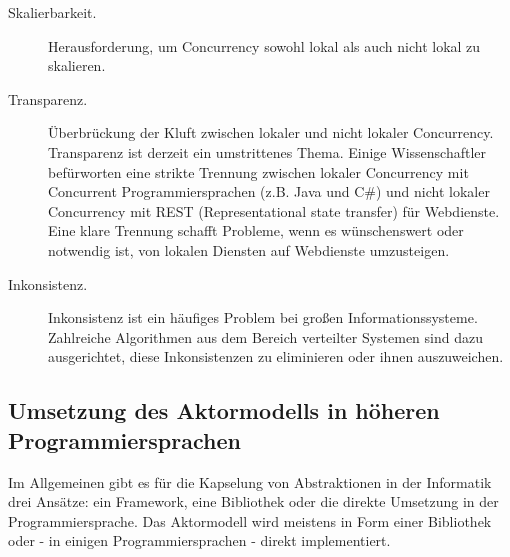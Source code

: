 \begin{description} 
	\item[Skalierbarkeit.] Herausforderung, um Concurrency sowohl lokal als auch nicht lokal zu skalieren.
	
	\item[Transparenz.] Überbrückung der Kluft zwischen lokaler und nicht lokaler Concurrency. Transparenz ist derzeit ein umstrittenes Thema. Einige Wissenschaftler befürworten eine strikte Trennung zwischen lokaler Concurrency mit Concurrent Programmiersprachen (z.B. Java und C\#) und nicht lokaler Concurrency mit REST (Representational state transfer) für Webdienste. Eine klare Trennung schafft Probleme, wenn es wünschenswert oder notwendig ist, von lokalen Diensten auf Webdienste umzusteigen.
	
	\item[Inkonsistenz.] Inkonsistenz ist ein häufiges Problem bei großen Informationssysteme. Zahlreiche Algorithmen aus dem Bereich verteilter Systemen sind dazu ausgerichtet, diese Inkonsistenzen zu eliminieren oder ihnen auszuweichen.
\end{description}

\subsection{Umsetzung des Aktormodells in höheren Programmiersprachen}

Im Allgemeinen gibt es für die Kapselung von Abstraktionen in der Informatik drei Ansätze: ein Framework, eine Bibliothek oder die direkte Umsetzung in der Programmiersprache. Das Aktormodell wird meistens in Form einer Bibliothek oder - in einigen Programmiersprachen - direkt implementiert.

